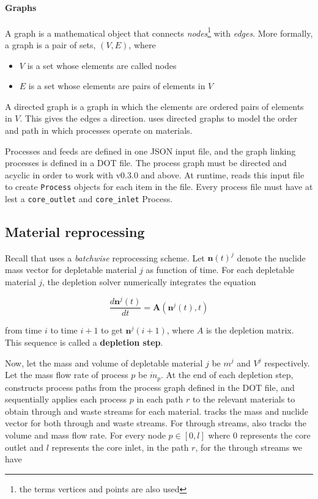 \paragraph{Graphs}
    A graph is a mathematical object that connects {\it nodes}\footnote{the
    terms vertices and points are also used} with {\it edges}. More formally,
    a graph is a pair of sets, $(V, E)$, where
    \begin{itemize}
        \item $V$ is a set whose elements are called nodes
        \item $E$ is a set whose elements are pairs of elements in $V$
    \end{itemize}
    A directed graph is a graph in which the elements are ordered pairs of elements
    in $V$. This gives the edges a direction. \SaltProc uses directed graphs to
    model the order and path in which processes operate on materials.
        
Processes and feeds are defined in one JSON input file, and the graph linking
processes is defined in a DOT file. The process graph must be directed and
acyclic in order to work with \SaltProc v0.3.0 and above. At runtime,
\SaltProc reads this input file to create \verb.Process. objects for each item
in the file. Every process file must have at lest a \verb.core_outlet. and
\verb.core_inlet. Process.

\subsection{Material reprocessing}
Recall that \SaltProc uses a {\it batchwise} reprocessing scheme.
Let $\mathbf{n}(t)^{j}$ denote the nuclide mass vector for depletable material
$j$ as function of time. For each depletable material $j$, the depletion
solver numerically integrates the equation

\begin{equation}
    \frac{d\mathbf{n}^{j}(t)}{dt} = \mathbf{A}(\mathbf{n}^{j}(t), t)
\end{equation}

from time $i$ to time $i+1$ to get $\mathbf{n}^{j}(i+1)$, where $A$ is the
depletion matrix. This sequence is called a {\bf depletion step}.

Now, let the mass and volume of depletable material $j$ be
$m^{j}$ and $V^{j}$ respectively. Let the mass flow rate of process $p$ be
$\dot{m}_{p}$. At the end of each depletion step, \SaltProc constructs process
paths from the process graph defined in the DOT file, and sequentially applies
each process $p$ in each path $r$ to the relevant materials to obtain through
and waste streams for each material. \SaltProc tracks the mass and nuclide vector for both through and waste streams. For through
streams, \SaltProc also tracks the volume and mass flow rate. For every node
$p\in[0,l]$ where $0$ represents the core outlet and $l$ represents the core
inlet, in the path $r$, for the through streams we have

